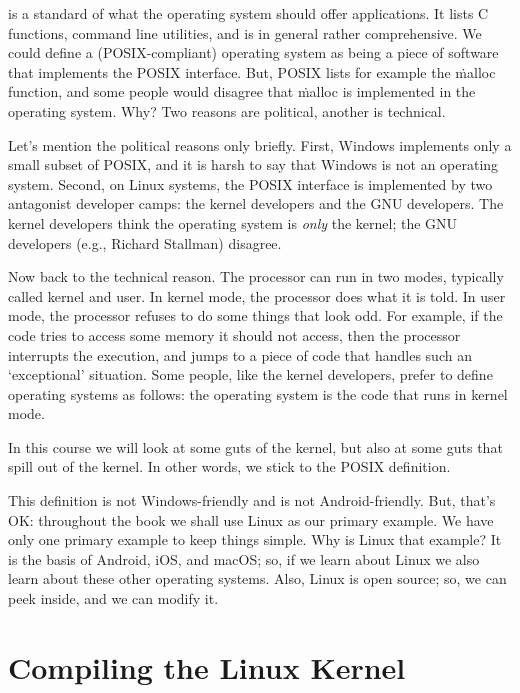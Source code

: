  is a standard of what the operating system should offer applications.
It lists C functions, command line utilities, and is in general rather comprehensive.
We could define a (POSIX-compliant) operating system as being a piece of software
  that implements the POSIX interface.
But, POSIX lists for example the \.{malloc} function,
  and some people would disagree that \.{malloc} is implemented in the operating system.
Why?
Two reasons are political, another is technical.

Let's mention the political reasons only briefly.
First, Windows implements only a small subset of POSIX,
  and it is harsh to say that Windows is not an operating system.
Second, on Linux systems,
  the POSIX interface is implemented by two antagonist developer camps:
  the kernel developers and the GNU developers.
The kernel developers think the operating system is \emph{only} the kernel;
  the GNU developers (e.g., Richard Stallman) disagree.

Now back to the technical reason.
The processor can run in two modes, typically called kernel and user.
In kernel mode, the processor does what it is told.
In user mode, the processor refuses to do some things that look odd.
For example, if the code tries to access some memory it should not access,
  then the processor interrupts the execution,
  and jumps to a piece of code that handles such an `exceptional' situation.
Some people, like the kernel developers,
  prefer to define operating systems as follows:
  the operating system is the code that runs in kernel mode.

In this course we will look at some guts of the kernel,
  but also at some guts that spill out of the kernel.
In other words, we stick to the POSIX definition.

\medskip

This definition is not Windows-friendly and is not Android-friendly.
But, that's OK:
  throughout the book we shall use Linux as our primary example.
We have only one primary example to keep things simple.
Why is Linux that example?
It is the basis of Android, iOS, and macOS;
  so, if we learn about Linux we also learn about these other operating systems.
Also, Linux is open source;
  so, we can peek inside, and we can modify it.

\section{Compiling the Linux Kernel}

